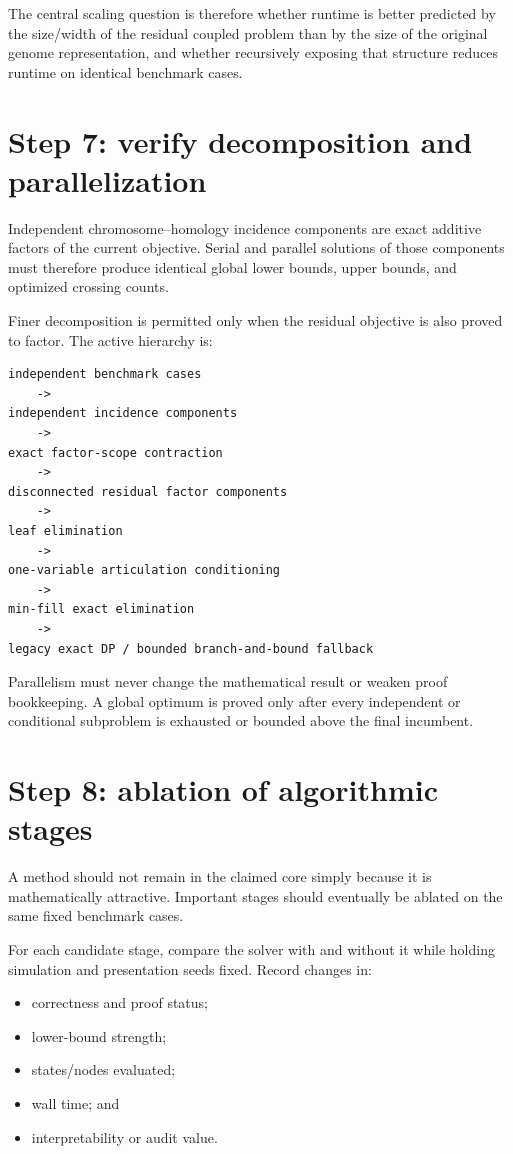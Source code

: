 \documentclass[11pt]{article}
\begin{document}
The central scaling question is therefore whether runtime is better predicted
by the size/width of the residual coupled problem than by the size of the
original genome representation, and whether recursively exposing that
structure reduces runtime on identical benchmark cases.

\section{Step 7: verify decomposition and parallelization}

Independent chromosome--homology incidence components are exact additive
factors of the current objective.  Serial and parallel solutions of those
components must therefore produce identical global lower bounds, upper bounds,
and optimized crossing counts.

Finer decomposition is permitted only when the residual objective is also
proved to factor.  The active hierarchy is:

\begin{verbatim}
independent benchmark cases
    ->
independent incidence components
    ->
exact factor-scope contraction
    ->
disconnected residual factor components
    ->
leaf elimination
    ->
one-variable articulation conditioning
    ->
min-fill exact elimination
    ->
legacy exact DP / bounded branch-and-bound fallback
\end{verbatim}

Parallelism must never change the mathematical result or weaken proof
bookkeeping.  A global optimum is proved only after every independent or
conditional subproblem is exhausted or bounded above the final incumbent.

\section{Step 8: ablation of algorithmic stages}

A method should not remain in the claimed core simply because it is
mathematically attractive.  Important stages should eventually be ablated on
the same fixed benchmark cases.

For each candidate stage, compare the solver with and without it while holding
simulation and presentation seeds fixed.  Record changes in:

\begin{itemize}
  \item correctness and proof status;
  \item lower-bound strength;
  \item states/nodes evaluated;
  \item wall time; and
  \item interpretability or audit value.
\end{itemize}
\end{document}
